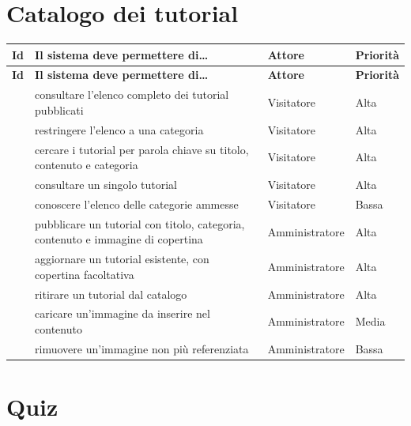 \section{Catalogo dei tutorial}

\begin{longtable}{@{}l L{7.3cm} L{2.6cm} L{1.8cm}@{}}
\toprule
\textbf{Id} & \textbf{Il sistema deve permettere di\dots} & \textbf{Attore} &
\textbf{Priorità} \\
\midrule
\endfirsthead
\toprule
\textbf{Id} & \textbf{Il sistema deve permettere di\dots} & \textbf{Attore} &
\textbf{Priorità} \\
\midrule
\endhead
\bottomrule
\endlastfoot

 & consultare l'elenco completo dei tutorial pubblicati &
  Visitatore & Alta \\
 & restringere l'elenco a una categoria & Visitatore & Alta \\
 & cercare i tutorial per parola chiave su titolo, contenuto e
  categoria & Visitatore & Alta \\
 & consultare un singolo tutorial & Visitatore & Alta \\
 & conoscere l'elenco delle categorie ammesse &
  Visitatore & Bassa \\
 & pubblicare un tutorial con titolo, categoria, contenuto e
  immagine di copertina & Amministratore & Alta \\
 & aggiornare un tutorial esistente, con copertina facoltativa &
  Amministratore & Alta \\
 & ritirare un tutorial dal catalogo & Amministratore & Alta \\
 & caricare un'immagine da inserire nel contenuto &
  Amministratore & Media \\
 & rimuovere un'immagine non più referenziata &
  Amministratore & Bassa \\

\end{longtable}

\section{Quiz}


